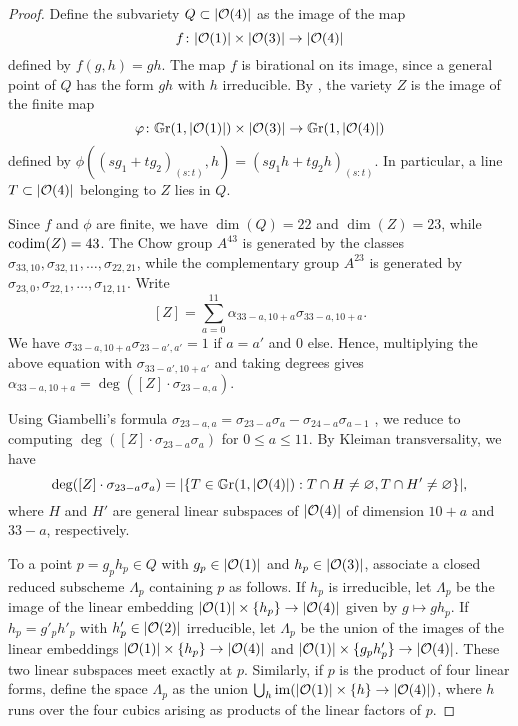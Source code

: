 \begin{proof}
	Define the subvariety $Q \subset \lvert\mathcal{O}(4)\rvert$ as the image of the map $$f\colon \lvert\mathcal{O}(1)\rvert \times \lvert\mathcal{O}(3)\rvert \to \lvert\mathcal{O}(4)\rvert$$ defined by $f(g,h) = gh$. The map $f$ is birational on its image, since a general point of $Q$ has the form $gh$ with $h$ irreducible. By , the variety $Z$ is the image of the finite map
	$$\varphi \colon \mathbb G \mathrm r(1,\lvert\mathcal{O}(1)\rvert) \times \lvert\mathcal{O}(3)\rvert \to \mathbb G \mathrm r(1,\lvert\mathcal{O}(4)\rvert)$$
	defined by $\phi((sg_1 + tg_2)_{(s:t)},h) = (sg_1h+tg_2h)_{(s:t)}$. In particular, a line $T\subset \lvert\mathcal{O}(4)\rvert$ belonging to $Z$ lies in $Q$.

	Since $f$ and $\phi$ are finite, we have $\dim(Q) = 22$ and $\dim(Z)=23$, while $\operatorname{codim}(Z)=43$. The Chow group $A^{43}$ is generated by the classes $\sigma_{33,10},\sigma_{32,11},\dotsc,\sigma_{22,21}$, while the complementary group $A^{23}$ is generated by
	$\sigma_{23,0},\sigma_{22,1},\dotsc,\sigma_{12,11}$. Write
	\[
		[Z] = \sum_{a=0}^{11} \alpha_{33-a,10+a} \sigma_{33-a,10+a}. 
	\]
	We have $\sigma_{33-a,10+a} \sigma_{23-a',a'} = 1$ if $a=a'$ and $0$ else. Hence, multiplying the above equation with $\sigma_{33-a',10+a'}$ and taking degrees gives
	$
	\alpha_{33-a,10+a} = \deg([Z]\cdot \sigma_{23-a,a}).
	$

	Using Giambelli's formula 
	$\sigma_{23-a,a}=\sigma_{23-a}\sigma_{a} - \sigma_{24-a}\sigma_{a-1}$ \cite[Prop.\ 4.16]{eisenbud-harris-intersection-theory}, we reduce to computing $\deg([Z] \cdot \sigma_{23-a}\sigma_{a})$ for $0\leq a\leq 11$.
	By Kleiman transversality, we have 
	\[
	\deg([Z] \cdot \sigma_{23-a}\sigma_{a}) = \lvert\{T\in \mathbb G \mathrm r(1,\lvert\mathcal{O}(4)\rvert) : T \cap H \neq \varnothing, T \cap H' \neq \varnothing\}\rvert,
	\] where $H$ and $H'$ are general linear subspaces of $\lvert\mathcal{O}(4)\rvert$ of dimension $10+a$ and $33-a$, respectively.

	To a point $p = g_p h_p \in Q$ with $g_p \in \lvert\mathcal{O}(1)\rvert$ and $h_p \in \lvert\mathcal{O}(3)\rvert$, associate a closed reduced subscheme $\Lambda_p$ containing $p$ as follows. If $h_p$ is irreducible, let $\Lambda_p$ be the image of the linear embedding $\lvert\mathcal{O}(1)\rvert\times \{h_p\} \to \lvert\mathcal{O}(4)\rvert$ given by $g \mapsto g h_p$. If $h_p = g'_p h'_p$ with $h'_p \in \lvert\mathcal{O}(2)\rvert$ irreducible, let $\Lambda_p$ be the union of the images of the linear embeddings $\lvert\mathcal{O}(1)\rvert \times \{h_p\} \to \lvert\mathcal{O}(4)\rvert$ and $\lvert\mathcal{O}(1)\rvert \times \{g_p h'_p\} \to \lvert\mathcal{O}(4)\rvert$. These two linear subspaces meet exactly at $p$. Similarly, if $p$ is the product of four linear forms, define the space $\Lambda_p$ as the union $\bigcup_h \operatorname{im}(\lvert\mathcal{O}(1)\rvert \times \{h\}\to \lvert\mathcal{O}(4)\rvert)$, where $h$ runs over the four cubics arising as products of the linear factors of $p$.


\end{proof}
